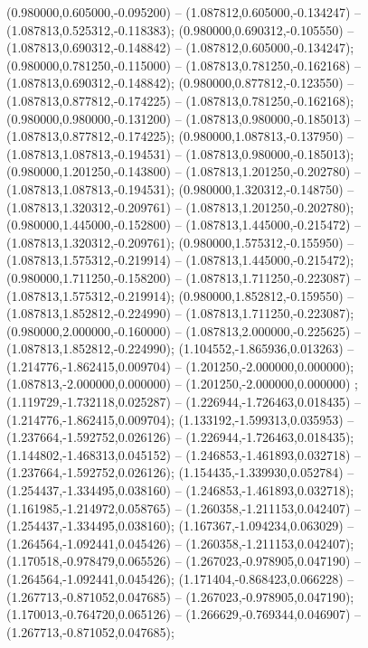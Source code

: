  (0.980000,0.605000,-0.095200) -- (1.087812,0.605000,-0.134247) -- (1.087813,0.525312,-0.118383);
 (0.980000,0.690312,-0.105550) -- (1.087813,0.690312,-0.148842) -- (1.087812,0.605000,-0.134247);
 (0.980000,0.781250,-0.115000) -- (1.087813,0.781250,-0.162168) -- (1.087813,0.690312,-0.148842);
 (0.980000,0.877812,-0.123550) -- (1.087813,0.877812,-0.174225) -- (1.087813,0.781250,-0.162168);
 (0.980000,0.980000,-0.131200) -- (1.087813,0.980000,-0.185013) -- (1.087813,0.877812,-0.174225);
 (0.980000,1.087813,-0.137950) -- (1.087813,1.087813,-0.194531) -- (1.087813,0.980000,-0.185013);
 (0.980000,1.201250,-0.143800) -- (1.087813,1.201250,-0.202780) -- (1.087813,1.087813,-0.194531);
 (0.980000,1.320312,-0.148750) -- (1.087813,1.320312,-0.209761) -- (1.087813,1.201250,-0.202780);
 (0.980000,1.445000,-0.152800) -- (1.087813,1.445000,-0.215472) -- (1.087813,1.320312,-0.209761);
 (0.980000,1.575312,-0.155950) -- (1.087813,1.575312,-0.219914) -- (1.087813,1.445000,-0.215472);
 (0.980000,1.711250,-0.158200) -- (1.087813,1.711250,-0.223087) -- (1.087813,1.575312,-0.219914);
 (0.980000,1.852812,-0.159550) -- (1.087813,1.852812,-0.224990) -- (1.087813,1.711250,-0.223087);
 (0.980000,2.000000,-0.160000) -- (1.087813,2.000000,-0.225625) -- (1.087813,1.852812,-0.224990);
 (1.104552,-1.865936,0.013263) -- (1.214776,-1.862415,0.009704) -- (1.201250,-2.000000,0.000000);
 (1.087813,-2.000000,0.000000) -- (1.201250,-2.000000,0.000000) ;
 (1.119729,-1.732118,0.025287) -- (1.226944,-1.726463,0.018435) -- (1.214776,-1.862415,0.009704);
 (1.133192,-1.599313,0.035953) -- (1.237664,-1.592752,0.026126) -- (1.226944,-1.726463,0.018435);
 (1.144802,-1.468313,0.045152) -- (1.246853,-1.461893,0.032718) -- (1.237664,-1.592752,0.026126);
 (1.154435,-1.339930,0.052784) -- (1.254437,-1.334495,0.038160) -- (1.246853,-1.461893,0.032718);
 (1.161985,-1.214972,0.058765) -- (1.260358,-1.211153,0.042407) -- (1.254437,-1.334495,0.038160);
 (1.167367,-1.094234,0.063029) -- (1.264564,-1.092441,0.045426) -- (1.260358,-1.211153,0.042407);
 (1.170518,-0.978479,0.065526) -- (1.267023,-0.978905,0.047190) -- (1.264564,-1.092441,0.045426);
 (1.171404,-0.868423,0.066228) -- (1.267713,-0.871052,0.047685) -- (1.267023,-0.978905,0.047190);
 (1.170013,-0.764720,0.065126) -- (1.266629,-0.769344,0.046907) -- (1.267713,-0.871052,0.047685);
